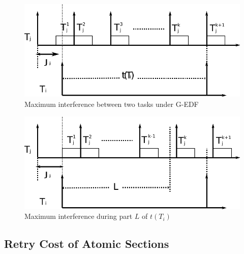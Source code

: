 \documentclass{sig-alternate}
\begin{document}
\begin{figure}%
\centering
\includegraphics[bb=0bp 0bp 542bp 162bp,scale=0.5]{figures/figure9-a}
\caption{\label{fig1} Maximum interference between two tasks under G-EDF}
\end{figure}


\begin{figure}
\centering
\includegraphics[bb=0bp 0bp 542bp 162bp,scale=0.5]{figures/figure9-b}
\caption{\label{fig2}Maximum interference during part $L$ of $t(T_{i})$}
\end{figure}



\subsection{Retry Cost of Atomic Sections}
\end{document}
